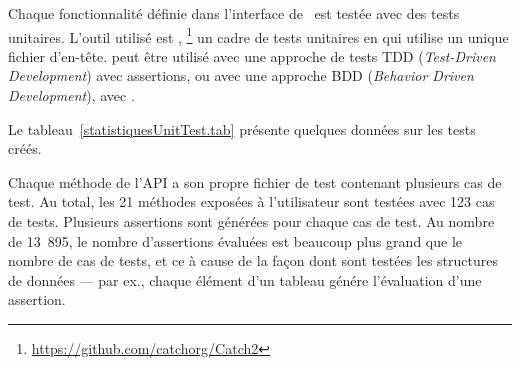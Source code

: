 Chaque fonctionnalit\'e d\'efinie dans l'interface de \ppff\ est test\'ee avec des tests unitaires. L'outil utilis\'e est ,%
%
\footnote{\url{https://github.com/catchorg/Catch2}}
%
un cadre de tests unitaires en  qui utilise un unique fichier
d'en-t\^ete.
%
 peut \^etre utilis\'e avec une approche de tests TDD
(\emph{Test-Driven Development}) avec assertions, 
ou avec une approche BDD (\emph{Behavior Driven Development}), avec .




Le tableau~\ref{statistiquesUnitTest.tab} pr\'esente quelques donn\'ees sur les tests cr\'e\'es.

Chaque m\'ethode de l'API a son propre fichier de test contenant plusieurs cas de test. Au total, les 21 m\'ethodes expos\'ees \`a l'utilisateur sont test\'ees avec 123 cas de tests. Plusieurs assertions sont g\'en\'er\'ees pour chaque cas de test. Au nombre de 13~895, le nombre d'assertions \'evalu\'ees est beaucoup plus grand que le nombre de cas de tests, et ce \`a cause de la fa\c{c}on dont sont test\'ees les structures de donn\'ees --- par ex., chaque \'el\'ement d'un tableau g\'en\'ere l'\'evaluation d'une assertion.
